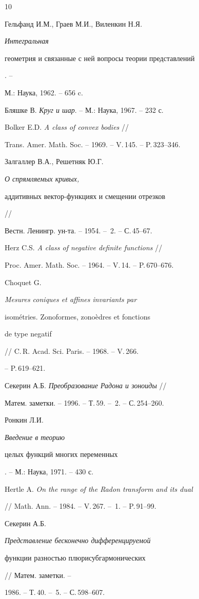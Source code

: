 \begin{thebibliography}{10}







Гельфанд И.М., Граев М.И., Виленкин Н.Я. {\em Интегральная 


геометрия и связанные с ней вопросы теории представлений}. -- 


М.: Наука, 1962. -- 656 c. 




Бляшке В. {\em Круг и шар}. -- М.: Наука, 1967. -- 232 с.




Bolker E.D. {\em A class of convex bodies} // 


Trans. Amer. Math. Soc. -- 1969. -- V.\,145. -- P.\,323--346.




Залгаллер В.А., Решетняк Ю.Г. {\em О спрямляемых кривых, 


аддитивных вектор-функциях и смещении отрезков} // 


Вестн. Ленингр. ун-та. -- 1954. -- \No\,2. --  С.\,45--67.




Herz C.S. {\em A class of negative definite functions} // 


Proc. Amer. Math. Soc. -- 1964.  -- V.\,14. --  P.\,670--676.




Choquet G. {\em Mesures coniques et affines invariants par 


isom\'etries. Zonoformes, zono\`edres et fonctions


de type negatif} // C.\,R. Acad. Sci. Paris. -- 1968. -- V.\,266.


-- P.\,619--621.




Секерин А.Б. {\em Преобразование Радона и зоноиды} //


Матем. заметки.  -- 1996. -- Т.\,59. -- \No\,2. -- С.\,254--260.




Ронкин Л.И. {\em Введение в теорию 


целых функций многих переменных}. -- М.: Наука, 1971. -- 430 с. 




Hertle A. {\em On the range of the Radon transform and its dual} 


// Math. Ann. -- 1984. -- V.\,267. -- \No\,1. -- P.\,91--99. 




Секерин А.Б. {\em Представление бесконечно дифференцируемой 


функции разностью плюрисубгармонических} // Матем. заметки. -- 


1986. -- Т.\,40. --  \No\,5. -- С.\,598--607. 





\end{thebibliography}





